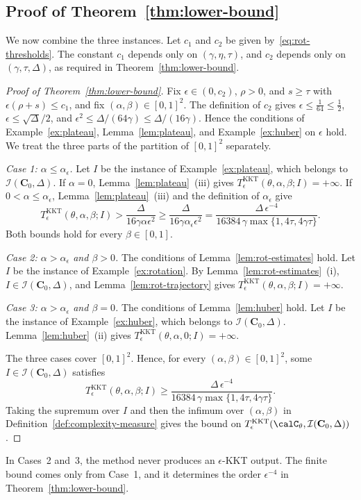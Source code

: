 \subsection{Proof of Theorem~\ref{thm:lower-bound}}
\label{subsec:lb-combine}

We now combine the three instances. Let \(c_1\) and \(c_2\) be given
by~\eqref{eq:rot-thresholds}. The constant \(c_1\) depends only on
\((\gamma,\eta,\tau)\), and \(c_2\) depends only on \((\gamma,\tau,\Delta)\),
as required in Theorem~\ref{thm:lower-bound}.

\begin{proof}[Proof of Theorem~\ref{thm:lower-bound}]
Fix \(\epsilon\in(0,c_2)\), \(\rho>0\), and \(s\ge\tau\) with
\(\epsilon(\rho+s)\le c_1\), and fix \((\alpha,\beta)\in[0,1]^2\). The
definition of \(c_2\) gives \(\epsilon\le\frac1{64}\le\frac12\),
\(\epsilon\le\sqrt\Delta/2\), and
\(\epsilon^2\le\Delta/(64\gamma)\le\Delta/(16\gamma)\). Hence the conditions
of Example~\ref{ex:plateau}, Lemma~\ref{lem:plateau}, and
Example~\ref{ex:huber} on \(\epsilon\) hold. We treat the three parts of the
partition of \([0,1]^2\) separately.

\emph{Case 1: \(\alpha\le\alpha_\epsilon\).} Let \(I\) be the instance of
Example~\ref{ex:plateau}, which belongs to \(\mathcal I(\mathbf C_0,\Delta)\).
If \(\alpha=0\), Lemma~\ref{lem:plateau}~(iii) gives
\(T^{\mathrm{KKT}}_\epsilon(\theta,\alpha,\beta;I)=+\infty\). If
\(0<\alpha\le\alpha_\epsilon\), Lemma~\ref{lem:plateau}~(iii) and the
definition of \(\alpha_\epsilon\) give
\[
T^{\mathrm{KKT}}_\epsilon(\theta,\alpha,\beta;I)
>\frac{\Delta}{16\gamma\alpha\epsilon^2}
\ge\frac{\Delta}{16\gamma\alpha_\epsilon\epsilon^2}
=\frac{\Delta\,\epsilon^{-4}}{16384\,\gamma\max\{1,4\tau,4\gamma\tau\}}.
\]
Both bounds hold for every \(\beta\in[0,1]\).

\emph{Case 2: \(\alpha>\alpha_\epsilon\) and \(\beta>0\).} The conditions of
Lemma~\ref{lem:rot-estimates} hold. Let \(I\) be the instance of
Example~\ref{ex:rotation}. By Lemma~\ref{lem:rot-estimates}~(i),
\(I\in\mathcal I(\mathbf C_0,\Delta)\), and Lemma~\ref{lem:rot-trajectory}
gives \(T^{\mathrm{KKT}}_\epsilon(\theta,\alpha,\beta;I)=+\infty\).

\emph{Case 3: \(\alpha>\alpha_\epsilon\) and \(\beta=0\).} The conditions of
Lemma~\ref{lem:huber} hold. Let \(I\) be the instance of
Example~\ref{ex:huber}, which belongs to \(\mathcal I(\mathbf C_0,\Delta)\).
Lemma~\ref{lem:huber}~(ii) gives
\(T^{\mathrm{KKT}}_\epsilon(\theta,\alpha,0;I)=+\infty\).

The three cases cover \([0,1]^2\). Hence, for every
\((\alpha,\beta)\in[0,1]^2\), some \(I\in\mathcal I(\mathbf C_0,\Delta)\)
satisfies
\[
T^{\mathrm{KKT}}_\epsilon(\theta,\alpha,\beta;I)
\ge\frac{\Delta\,\epsilon^{-4}}{16384\,\gamma\max\{1,4\tau,4\gamma\tau\}}.
\]
Taking the supremum over \(I\) and then the infimum over \((\alpha,\beta)\)
in Definition~\ref{def:complexity-measure} gives the bound on
\(T^{\mathrm{KKT}}_\epsilon(\calC_\theta,\mathcal I(\mathbf C_0,\Delta))\).
\end{proof}

In Cases~2 and~3, the method never produces an \(\epsilon\)-KKT output.
The finite bound comes only from Case~1, and it determines the order
\(\epsilon^{-4}\) in Theorem~\ref{thm:lower-bound}.
